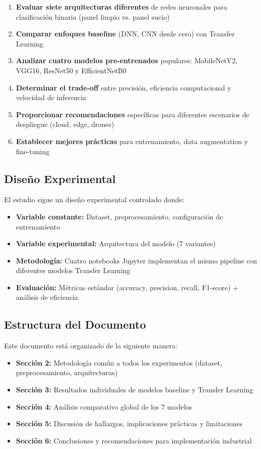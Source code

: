 \documentclass[11pt, a4paper]{article}
\begin{document}
\begin{enumerate}
    \item \textbf{Evaluar siete arquitecturas diferentes} de redes neuronales para clasificación binaria (panel limpio vs. panel sucio)
    \item \textbf{Comparar enfoques baseline} (DNN, CNN desde cero) con Transfer Learning
    \item \textbf{Analizar cuatro modelos pre-entrenados} populares: MobileNetV2, VGG16, ResNet50 y EfficientNetB0
    \item \textbf{Determinar el trade-off} entre precisión, eficiencia computacional y velocidad de inferencia
    \item \textbf{Proporcionar recomendaciones} específicas para diferentes escenarios de despliegue (cloud, edge, drones)
    \item \textbf{Establecer mejores prácticas} para entrenamiento, data augmentation y fine-tuning
\end{enumerate}

\subsection{Diseño Experimental}

El estudio sigue un diseño experimental controlado donde:

\begin{itemize}
    \item \textbf{Variable constante:} Dataset, preprocesamiento, configuración de entrenamiento
    \item \textbf{Variable experimental:} Arquitectura del modelo (7 variantes)
    \item \textbf{Metodología:} Cuatro notebooks Jupyter implementan el mismo pipeline con diferentes modelos Transfer Learning
    \item \textbf{Evaluación:} Métricas estándar (accuracy, precision, recall, F1-score) + análisis de eficiencia
\end{itemize}

\subsection{Estructura del Documento}

Este documento está organizado de la siguiente manera:

\begin{itemize}
    \item \textbf{Sección 2:} Metodología común a todos los experimentos (dataset, preprocesamiento, arquitecturas)
    \item \textbf{Sección 3:} Resultados individuales de modelos baseline y Transfer Learning
    \item \textbf{Sección 4:} Análisis comparativo global de los 7 modelos
    \item \textbf{Sección 5:} Discusión de hallazgos, implicaciones prácticas y limitaciones
    \item \textbf{Sección 6:} Conclusiones y recomendaciones para implementación industrial
\end{itemize}
\end{document}
